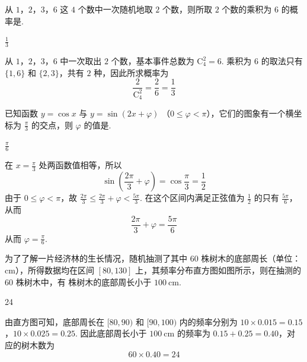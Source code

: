 \begin{problem}
从 \(1\)，\(2\)，\(3\)，\(6\) 这 \(4\) 个数中一次随机地取 \(2\) 个数，则所取 \(2\) 个数的乘积为 \(6\) 的概率是\fillinblank{}.
\end{problem}

\begin{answer}
\(\frac{1}{3}\)
\end{answer}

\begin{solution}
从 \(1\)，\(2\)，\(3\)，\(6\) 中一次取出 \(2\) 个数，基本事件总数为 \(\mathrm C_4^2=6\). 乘积为 \(6\) 的取法只有 \(\{1,6\}\) 和 \(\{2,3\}\)，共有 \(2\) 种，因此所求概率为
\[
\frac{2}{\mathrm C_4^2}=\frac{2}{6}=\frac13
\]
\end{solution}

\begin{problem}
已知函数 \( y = \cos x \) 与 \( y = \sin (2x + \varphi) \) （\( 0 \leqslant \varphi < \pi \)），它们的图象有一个横坐标为 \( \frac{\pi}{3} \) 的交点，则 \( \varphi \) 的值是\fillinblank{}.
\end{problem}

\begin{answer}
\(\frac{\pi}{6}\)
\end{answer}

\begin{solution}
在 \(x=\frac\pi3\) 处两函数值相等，所以
\[
\sin\left(\frac{2\pi}{3}+\varphi\right)=\cos\frac\pi3=\frac12
\]
由于 \(0\leqslant\varphi<\pi\)，故
\(\frac{2\pi}{3}\leqslant\frac{2\pi}{3}+\varphi<\frac{5\pi}{3}\). 在这个区间内满足正弦值为 \(\frac12\) 的只有 \(\frac{5\pi}{6}\)，从而
\[
\frac{2\pi}{3}+\varphi=\frac{5\pi}{6}
\]
从而 \(\varphi=\frac\pi6\).
\end{solution}

\begin{problem}
为了了解一片经济林的生长情况，随机抽测了其中 \(60\) 株树木的底部周长（单位：\(\mathrm{cm}\)），所得数据均在区间 \([80,130]\) 上，其频率分布直方图如图所示，则在抽测的 \(60\) 株树木中，有\fillinblank{} 株树木的底部周长小于 \(100 \mathrm{~cm}\).

\end{problem}

\begin{answer}
24
\end{answer}

\begin{solution}
由直方图可知，底部周长在 \([80,90)\) 和 \([90,100)\) 内的频率分别为 \(10\times0.015=0.15\)，\(10\times0.025=0.25\).
因此底部周长小于 \(100\mathrm{~cm}\) 的频率为 \(0.15+0.25=0.40\)，对应的树木数为
\[
60\times0.40=24
\]
\end{solution}

